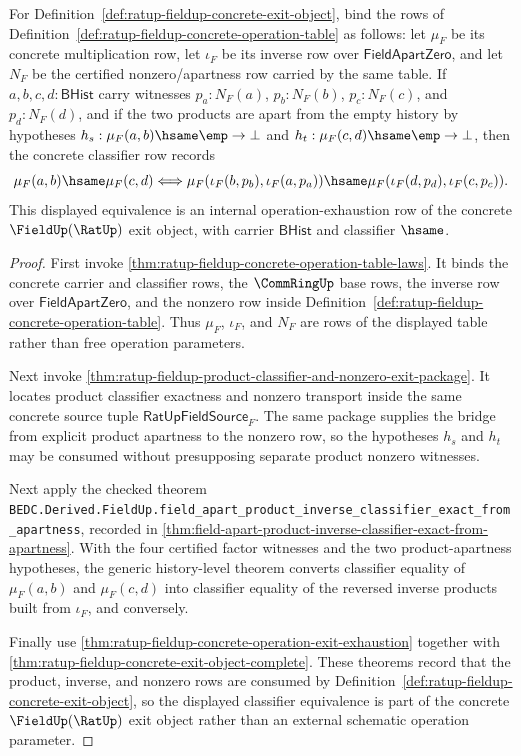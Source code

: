 \begin{theorem}
\label{thm:ratup-fieldup-inverse-product-classifier-exit-row}
For Definition~\ref{def:ratup-fieldup-concrete-exit-object}, bind the rows of
Definition~\ref{def:ratup-fieldup-concrete-operation-table} as follows: let
$\mu_F$ be its concrete multiplication row, let $\iota_F$ be its inverse row
over $\mathsf{FieldApartZero}$, and let $N_F$ be the certified
nonzero/apartness row carried by the same table. If
$a,b,c,d:\mathsf{BHist}$ carry witnesses $p_a:N_F(a)$, $p_b:N_F(b)$,
$p_c:N_F(c)$, and $p_d:N_F(d)$, and if the two products are apart from the
empty history by hypotheses
$h_s:\mu_F(a,b)\hsame\emp\to\bot$ and
$h_t:\mu_F(c,d)\hsame\emp\to\bot$, then the concrete classifier row records
$$
\mu_F(a,b)\hsame\mu_F(c,d)
\Longleftrightarrow
\mu_F(\iota_F(b,p_b),\iota_F(a,p_a))\hsame
\mu_F(\iota_F(d,p_d),\iota_F(c,p_c)).
$$
This displayed equivalence is an internal operation-exhaustion row of the
concrete $\FieldUp(\RatUp)$ exit object, with carrier $\mathsf{BHist}$ and
classifier $\hsame$.
\end{theorem}
\begin{proof}
First invoke \autoref{thm:ratup-fieldup-concrete-operation-table-laws}. It
binds the concrete carrier and classifier rows, the $\CommRingUp$ base rows, the
inverse row over $\mathsf{FieldApartZero}$, and the nonzero row inside
Definition~\ref{def:ratup-fieldup-concrete-operation-table}. Thus $\mu_F$,
$\iota_F$, and $N_F$ are rows of the displayed table rather than free operation
parameters.

Next invoke
\autoref{thm:ratup-fieldup-product-classifier-and-nonzero-exit-package}. It
locates product classifier exactness and nonzero transport inside the same
concrete source tuple $\mathsf{RatUpFieldSource}_F$. The same package supplies
the bridge from explicit product apartness to the nonzero row, so the
hypotheses $h_s$ and $h_t$ may be consumed without presupposing separate
product nonzero witnesses.

Next apply the checked theorem
\texttt{BEDC.Derived.FieldUp.field\_apart\_product\_inverse\_classifier\_exact\_from\_apartness},
recorded in
\autoref{thm:field-apart-product-inverse-classifier-exact-from-apartness}. With
the four certified factor witnesses and the two product-apartness hypotheses,
the generic history-level theorem converts classifier equality of
$\mu_F(a,b)$ and $\mu_F(c,d)$ into classifier equality of the reversed inverse
products built from $\iota_F$, and conversely.

Finally use
\autoref{thm:ratup-fieldup-concrete-operation-exit-exhaustion} together with
\autoref{thm:ratup-fieldup-concrete-exit-object-complete}. These theorems record
that the product, inverse, and nonzero rows are consumed by
Definition~\ref{def:ratup-fieldup-concrete-exit-object}, so the displayed
classifier equivalence is part of the concrete $\FieldUp(\RatUp)$ exit object
rather than an external schematic operation parameter.
\end{proof}

